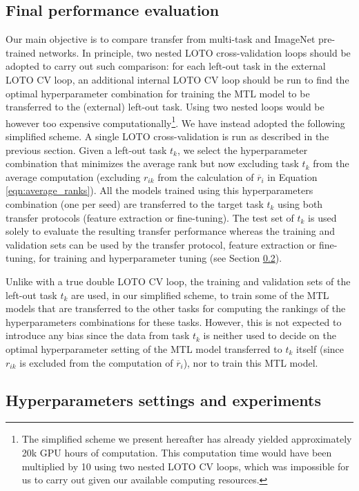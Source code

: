 \subsection{Final performance evaluation}
\label{ssec:mtask:exp:model_eval}

Our main objective is to compare transfer from multi-task and ImageNet pre-trained networks. In principle, two nested LOTO cross-validation loops should be adopted to carry out such comparison:  for each left-out task in the external LOTO CV loop, an additional internal LOTO CV loop should be run to find the optimal hyperparameter combination for training the MTL model to be transferred to the (external) left-out task. Using two nested loops would be however too expensive computationally\footnote{The simplified scheme we present hereafter has already yielded approximately 20k GPU hours of computation. This computation time would have been multiplied by 10 using two nested LOTO CV loops, which was impossible for us to carry out given our available computing resources.}. We have instead adopted the following simplified scheme. A single LOTO cross-validation is run as described in the previous section. Given a left-out task $t_k$, we select the hyperparameter combination that minimizes the average rank but now excluding task $t_k$ from the average computation (\ie excluding $r_{ik}$ from the calculation of $\overline{r}_i$ in Equation \ref{eqn:average_ranks}). All the models trained using this hyperparameters combination (\ie one per seed) are transferred to the target task $t_k$ using both transfer protocols (\ie feature extraction or fine-tuning). The test set of $t_k$ is used solely to evaluate the resulting transfer performance whereas the training and validation sets can be used by the transfer protocol, feature extraction or fine-tuning, for training and hyperparameter tuning (see Section \ref{ssec:mtask:exp:parameters}).

Unlike with a true double LOTO CV loop, the training and validation sets of the left-out task $t_k$ are used, in our simplified scheme, to train some of the MTL models that are transferred to the other tasks for computing the rankings of the hyperparameters combinations for these tasks. However, this is not expected to introduce any bias since the data from task $t_k$ is neither used to decide on the optimal hyperparameter setting of the MTL model transferred to $t_k$ itself (since $r_{ik}$ is excluded from the computation of $\overline{r}_i$), nor to train this MTL model.

\subsection{Hyperparameters settings and experiments}
\label{ssec:mtask:exp:parameters} 

